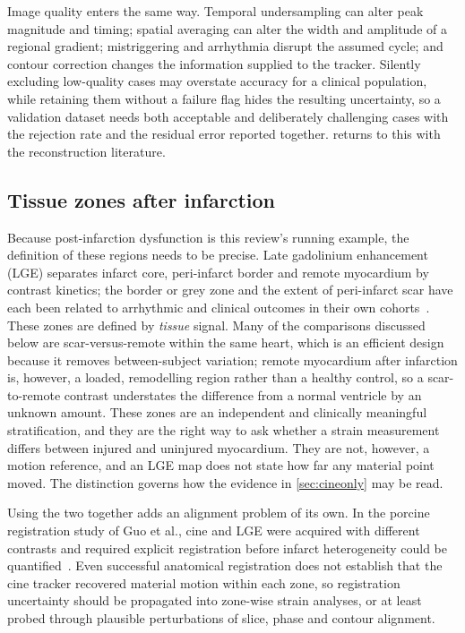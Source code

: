 Image quality enters the same way. Temporal undersampling can alter peak magnitude and timing;
spatial averaging can alter the width and amplitude of a regional gradient; mistriggering and
arrhythmia disrupt the assumed cycle; and contour correction changes the information supplied to the
tracker. Silently excluding low-quality cases may overstate accuracy for a clinical population,
while retaining them without a failure flag hides the resulting uncertainty, so a validation dataset
needs both acceptable and deliberately challenging cases with the rejection rate and the residual
error reported together.  returns to this with the reconstruction literature.

\subsection{Tissue zones after infarction}\label{sec:zones}

Because post-infarction dysfunction is this review's running example, the definition of these
regions needs to be precise. Late gadolinium enhancement (LGE) separates infarct core,
peri-infarct border and remote myocardium by contrast kinetics; the border or grey zone and the
extent of peri-infarct scar have each been related to arrhythmic and clinical outcomes in their own
cohorts~\citep{yang2013,tulumen2021}. These zones are defined by \emph{tissue} signal. Many of
the comparisons discussed below are scar-versus-remote within the same heart, which is an efficient
design because it removes between-subject variation; remote myocardium after infarction is, however, a
loaded, remodelling region rather than a healthy control, so a scar-to-remote contrast understates
the difference from a normal ventricle by an unknown amount. These zones are an
independent and clinically meaningful stratification, and they are the right way to ask whether a
strain measurement differs between injured and uninjured myocardium. They are not, however, a motion
reference, and an LGE map does not state how far any material point moved. The distinction governs
how the evidence in \cref{sec:cineonly} may be read.

Using the two together adds an alignment problem of its own. In the porcine registration study of
Guo et al., cine and LGE were acquired with different contrasts and required explicit registration
before infarct heterogeneity could be quantified~\citep{guo2021}. Even successful anatomical
registration does not establish that the cine tracker recovered material motion within each zone, so
registration uncertainty should be propagated into zone-wise strain analyses, or at least probed
through plausible perturbations of slice, phase and contour alignment.

